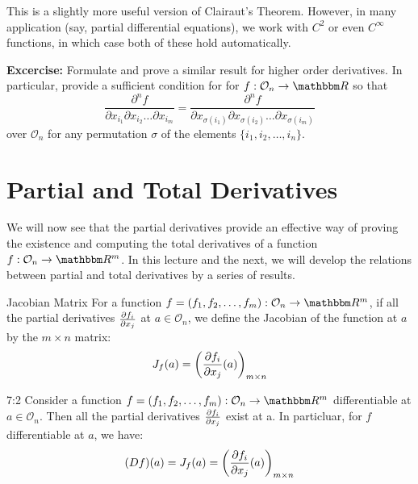 \documentclass[../Analysis-3]{subfiles}
\begin{document}
This is a slightly more useful version of Clairaut's Theorem. However, in many application (say, partial differential equations), we work with $C^2$ or even $C^\infty$ functions, in which case both of these hold automatically.\\

\vspace{.2 cm}

\textbf{Excercise:} Formulate and prove a similar result for higher order derivatives. In particular, provide a sufficient condition for  for $f: \mathcal{O}_n \to \R$ so that
\[\frac{\partial^n f}{\partial x_{i_1} \partial x_{i_2} \dots \partial x_{i_m}} = \frac{\partial^n f}{\partial x_{\sigma(i_1)} \partial x_{\sigma(i_2)} \dots \partial x_{\sigma(i_m)}}\]
over $\mathcal{O}_n$ for any permutation $\sigma$ of the elements $\{i_1,i_2,\dots,i_n\}$.

\section{Partial and Total Derivatives}

We will now see that the partial derivatives provide an effective way of proving the existence and computing the total derivatives of a function $f: \mathcal{O}_n \to \R^m$. In this lecture and the next, we will develop the relations between partial and total derivatives by a series of results.

\begin{Def}{Jacobian Matrix}{}
  For a function $f = (f_1, f_2, \dots, f_m): \mathcal{O}_n \to \R^m$, if all the partial derivatives $\pdv{f_i}{x_j}$ at $a \in \mathcal{O}_n$, we define the Jacobian of the function at $a$ by the $m \times n$ matrix:
  \[J_f(a) = \left( \pdv{f_i}{x_j}\/(a) \right)_{m \times n}\]
\end{Def}

\begin{Thm}{}{7:2}
  Consider a function $f = (f_1, f_2, \dots, f_m): \mathcal{O}_n \to \R^m$ differentiable at $a \in \mathcal{O}_n$. Then all the partial derivatives $\pdv{f_i}{x_j}$ exist at a. In particluar, for $f$ differentiable at $a$, we have:
  \[(Df)(a) = J_f(a) = \left( \pdv{f_i}{x_j} \/ (a)\right)_{m \times n}\]
\end{Thm}
\end{document}
